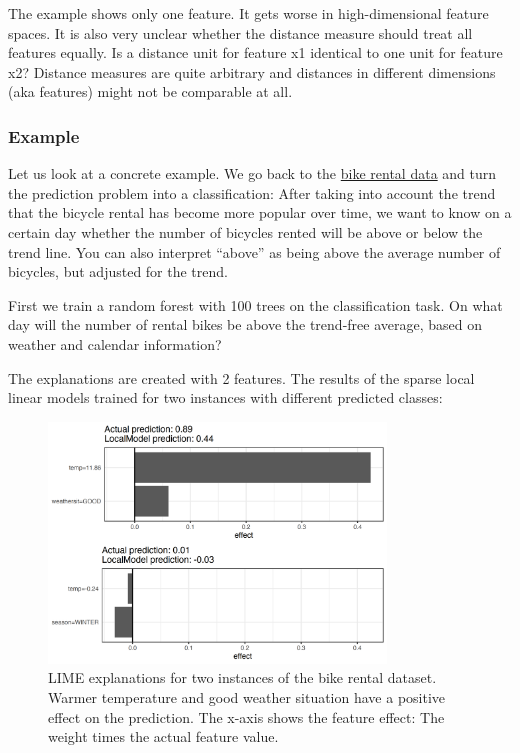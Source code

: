 \documentclass[
  10pt,
]{scrbook}
\begin{document}
The example shows only one feature.
It gets worse in high-dimensional feature spaces.
It is also very unclear whether the distance measure should treat all features equally.
Is a distance unit for feature x1 identical to one unit for feature x2?
Distance measures are quite arbitrary and distances in different dimensions (aka features) might not be comparable at all.

\hypertarget{example-5}{%
\subsubsection{Example}\label{example-5}}

Let us look at a concrete example.
We go back to the \protect\hyperlink{bike-data}{bike rental data} and turn the prediction problem into a classification:
After taking into account the trend that the bicycle rental has become more popular over time, we want to know on a certain day whether the number of bicycles rented will be above or below the trend line.
You can also interpret ``above'' as being above the average number of bicycles, but adjusted for the trend.

First we train a random forest with 100 trees on the classification task.
On what day will the number of rental bikes be above the trend-free average, based on weather and calendar information?

The explanations are created with 2 features.
The results of the sparse local linear models trained for two instances with different predicted classes:

\begin{figure}

{\centering \includegraphics[width=0.8\textwidth]{images/lime-tabular-example-explain-plot-1-1} 

}

\caption{LIME explanations for two instances of the bike rental dataset. Warmer temperature and good weather situation have a positive effect on the prediction. The x-axis shows the feature effect: The weight times the actual feature value.}\label{fig:lime-tabular-example-explain-plot-1}
\end{figure}
\end{document}

